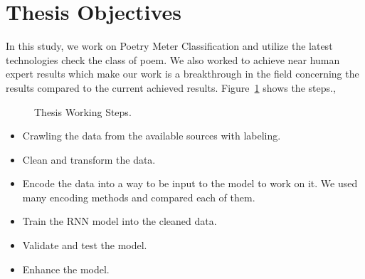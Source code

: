 \section{Thesis Objectives}
In this study, we work on Poetry Meter Classification and utilize the latest technologies check the class of poem. We also worked to achieve near human expert results which make our work is a breakthrough in the field concerning the results compared to the current achieved results. Figure~\ref{Fig:Thesis_Cycle} shows the steps.,
\begin{figure}[!t]
   
  \caption{Thesis Working Steps.}
  \label{Fig:Thesis_Cycle}
\end{figure}

\begin{itemize}
\item Crawling the data from the available sources with labeling.
\item Clean and transform the data.
\item Encode the data into a way to be input to the model to work on it. We used many encoding methods and compared each of them.
\item Train the RNN model into the cleaned data.
\item Validate and test the model.
\item Enhance the model.

\end{itemize}





\clearpage


%	
%	
%	



